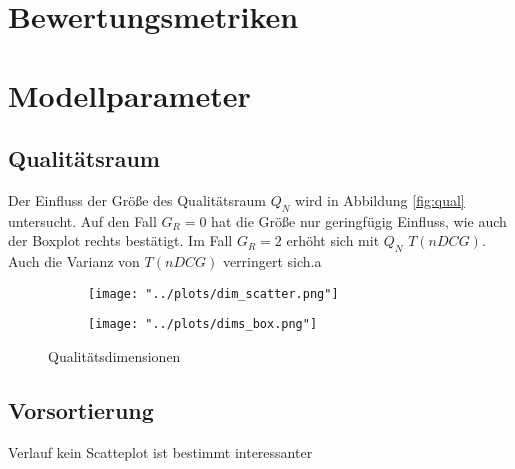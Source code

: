 \section{Bewertungsmetriken}


\section{Modellparameter}

\subsection{Qualitätsraum}

Der Einfluss der Größe des Qualitätsraum $Q_N$ wird in Abbildung \ref{fig:qual} untersucht. 
Auf den Fall $G_R = 0$ hat die Größe nur geringfügig Einfluss, wie auch der Boxplot rechts bestätigt. Im Fall $G_R = 2$ erhöht sich mit $Q_N$ $T(nDCG)$. Auch die Varianz von $T(nDCG)$ verringert sich.a

\begin{figure}[!h]
	\label{fig:qual}	
	\begin{subfigure}{0.5\textwidth}
		\texttt{[image: "../plots/dim\_scatter.png"]}
	\end{subfigure}
	\begin{subfigure}{0.5\textwidth}
		\texttt{[image: "../plots/dims\_box.png"]}
	\end{subfigure}
	\caption{Qualitätsdimensionen}
\end{figure}

\subsection{Vorsortierung}

Verlauf kein Scatteplot ist bestimmt interessanter






